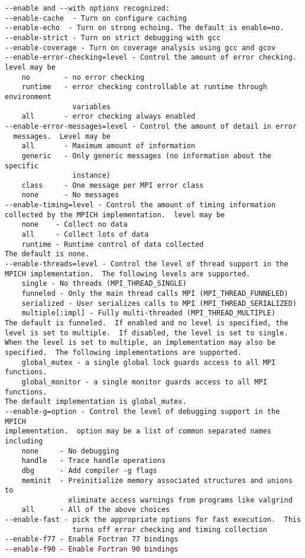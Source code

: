 \documentclass[dvipdfm,11pt]{article}
\begin{document}
\begin{verbatim}
--enable and --with options recognized:
--enable-cache  - Turn on configure caching
--enable-echo  - Turn on strong echoing. The default is enable=no. 
--enable-strict - Turn on strict debugging with gcc
--enable-coverage - Turn on coverage analysis using gcc and gcov
--enable-error-checking=level - Control the amount of error checking.  
level may be 
    no        - no error checking
    runtime   - error checking controllable at runtime through environment 
                variables
    all       - error checking always enabled
--enable-error-messages=level - Control the amount of detail in error 
  messages.  Level may be
    all       - Maximum amount of information
    generic   - Only generic messages (no information about the specific
                instance)
    class     - One message per MPI error class
    none      - No messages
--enable-timing=level - Control the amount of timing information 
collected by the MPICH implementation.  level may be
    none    - Collect no data
    all     - Collect lots of data
    runtime - Runtime control of data collected
The default is none.
--enable-threads=level - Control the level of thread support in the 
MPICH implementation.  The following levels are supported.
    single - No threads (MPI_THREAD_SINGLE)
    funneled - Only the main thread calls MPI (MPI_THREAD_FUNNELED)
    serialized - User serializes calls to MPI (MPI_THREAD_SERIALIZED)
    multiple[:impl] - Fully multi-threaded (MPI_THREAD_MULTIPLE)
The default is funneled.  If enabled and no level is specified, the
level is set to multiple.  If disabled, the level is set to single.
When the level is set to multiple, an implementation may also be
specified.  The following implementations are supported.
    global_mutex - a single global lock guards access to all MPI functions.
    global_monitor - a single monitor guards access to all MPI functions.
The default implementation is global_mutex.
--enable-g=option - Control the level of debugging support in the MPICH
implementation.  option may be a list of common separated names including
    none     - No debugging
    handle   - Trace handle operations
    dbg      - Add compiler -g flags
    meminit  - Preinitialize memory associated structures and unions to
               eliminate access warnings from programs like valgrind
    all      - All of the above choices
--enable-fast - pick the appropriate options for fast execution.  This
                turns off error checking and timing collection
--enable-f77 - Enable Fortran 77 bindings
--enable-f90 - Enable Fortran 90 bindings

\end{verbatim}
\end{document}
